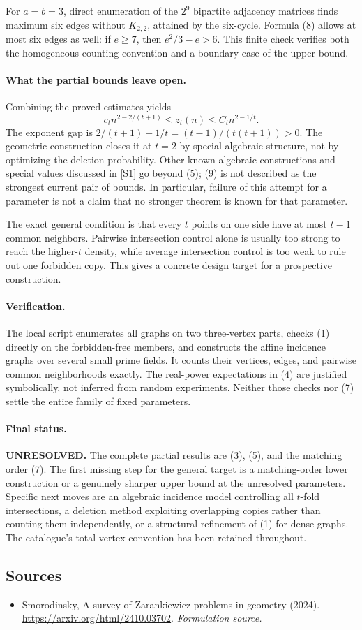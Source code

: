 \documentclass[11pt]{article}
\begin{document}
For $a=b=3$, direct enumeration of the $2^9$ bipartite adjacency
matrices finds maximum six edges without $K_{2,2}$, attained by the
six-cycle. Formula (8) allows at most six edges as well:
if $e\ge7$, then $e^2/3-e>6$. This finite check verifies both the
homogeneous counting convention and a boundary case of the upper bound.

\paragraph{What the partial bounds leave open.}
Combining the proved estimates yields
\[
 c_t n^{2-2/(t+1)}\le z_t(n)\le C_t n^{2-1/t}.           \tag{9}
\]
The exponent gap is
$2/(t+1)-1/t=(t-1)/(t(t+1))>0$.
The geometric construction closes it at $t=2$ by special algebraic
structure, not by optimizing the deletion probability. Other known
algebraic constructions and special values discussed in [S1] go beyond
(5); (9) is not described as the strongest current pair of bounds.
In particular, failure of this attempt for a parameter is not a claim
that no stronger theorem is known for that parameter.

The exact general condition is that every $t$ points on one side have
at most $t-1$ common neighbors. Pairwise intersection control alone is
usually too strong to reach the higher-$t$ density, while average
intersection control is too weak to rule out one forbidden copy.
This gives a concrete design target for a prospective construction.

\paragraph{Verification.}
The local script enumerates all graphs on two three-vertex parts,
checks (1) directly on the forbidden-free members, and constructs the
affine incidence graphs over several small prime fields. It counts
their vertices, edges, and pairwise common neighborhoods exactly.
The real-power expectations in (4) are justified symbolically, not
inferred from random experiments. Neither those checks nor (7) settle
the entire family of fixed parameters.

\paragraph{Final status.}
\textbf{UNRESOLVED.} The complete partial results are (3), (5), and
the matching order (7). The first missing step for the general target
is a matching-order lower construction or a genuinely sharper upper
bound at the unresolved parameters. Specific next moves are an
algebraic incidence model controlling all $t$-fold intersections,
a deletion method exploiting overlapping copies rather than counting
them independently, or a structural refinement of (1) for dense graphs.
The catalogue's total-vertex convention has been retained throughout.

\subsection{Sources}
\begin{itemize}
\item[S1]Smorodinsky, A survey of Zarankiewicz problems in geometry (2024).
\url{https://arxiv.org/html/2410.03702}.
\textit{Formulation source.}
\end{itemize}
\end{document}
